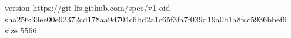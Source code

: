 version https://git-lfs.github.com/spec/v1
oid sha256:39ee00e92372cd178aa9d704c6bd2a1c65f3fa7f039d19a0b1a8fcc5936bbef6
size 5566
